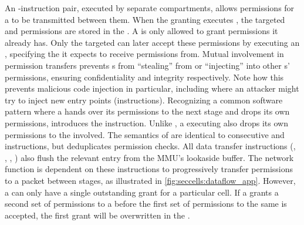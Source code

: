 An \scgrant-\screcv instruction pair, executed by
separate compartments, allows permissions for a \cell to be 
transmitted between them.
When the granting \secdiv executes \scgrant, the targeted
\sid and permissions are stored in the \gtable.
A \secdiv is only allowed to grant permissions it already has.
Only the targeted \secdiv can later accept these permissions
by executing an \screcv, specifying the \secdiv it expects to
receive permissions from.
Mutual involvement in permission transfers prevents \secdiv{}s
from ``stealing'' from or ``injecting'' into other \secdiv{}s'
permissions, ensuring confidentiality and integrity respectively.
Note how this prevents malicious code injection in particular,
including where an attacker might try to inject new entry 
points (\sdentry instructions).
Recognizing a common software pattern where a \secdiv hands over 
its permissions to the next stage and drops its own permissions, 
\seccells introduces the \sctfer instruction.
Unlike \scgrant, a \secdiv executing \sctfer also drops its
own permissions to the \cell involved.
The semantics of \sctfer are identical to consecutive \scgrant and 
\scprot instructions, but \sctfer deduplicates permission checks.
All data transfer instructions (\scprot, \scgrant, \sctfer, \screcv)
also flush the relevant entry from the MMU's lookaside buffer.
The network function is dependent on these instructions to
progressively transfer permissions to a packet between stages,
as illustrated in \autoref{fig:seccells:dataflow_app}.
However, a \secdiv can only have a single outstanding grant for
a particular cell. 
If a \secdiv grants a second set of permissions to a \cell before
the first set of permissions to the same \cell is accepted,
the first grant will be overwritten in the \gtable.

